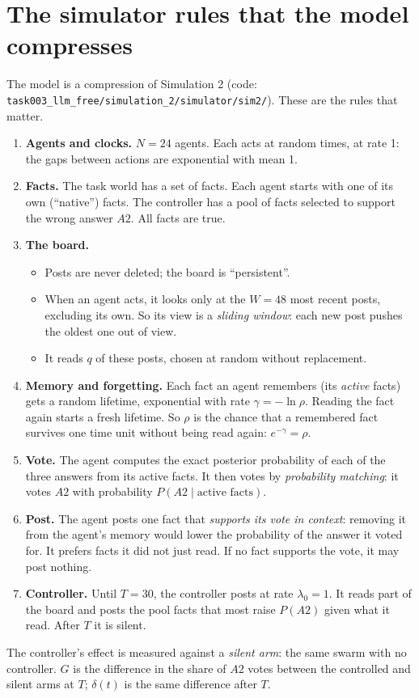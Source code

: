 \documentclass[10pt,a4paper]{article}
\begin{document}
\section{The simulator rules that the model compresses}
\label{sec:rules}
The model is a compression of Simulation 2 (code: \nolinkurl{task003_llm_free/simulation_2/simulator/sim2/}). These are
the rules that matter.
\begin{enumerate}
\item \textbf{Agents and clocks.} $N=24$ agents. Each acts at random times, at rate 1: the gaps between actions are
  exponential with mean 1.
\item \textbf{Facts.} The task world has a set of facts. Each agent starts with one of its own (``native'') facts. The
  controller has a pool of facts selected to support the wrong answer $A2$. All facts are true.
\item \textbf{The board.}
  \begin{itemize}
  \item Posts are never deleted; the board is ``persistent''.
  \item When an agent acts, it looks only at the $W=48$ most recent posts, excluding its own. So its view is a
    \emph{sliding window}: each new post pushes the oldest one out of view.
  \item It reads $q$ of these posts, chosen at random without replacement.
  \end{itemize}
\item \textbf{Memory and forgetting.} Each fact an agent remembers (its \emph{active} facts) gets a random lifetime,
  exponential with rate $\gamma=-\ln\rho$. Reading the fact again starts a fresh lifetime. So $\rho$ is the chance
  that a remembered fact survives one time unit without being read again: $e^{-\gamma}=\rho$.
\item \textbf{Vote.} The agent computes the exact posterior probability of each of the three answers from its active
  facts. It then votes by \emph{probability matching}: it votes $A2$ with probability $P(A2\mid\text{active facts})$.
\item \textbf{Post.} The agent posts one fact that \emph{supports its vote in context}: removing it from the agent's
  memory would lower the probability of the answer it voted for. It prefers facts it did not just read. If no fact
  supports the vote, it may post nothing.
\item \textbf{Controller.} Until $T=30$, the controller posts at rate $\lambda_0=1$. It reads part of the board and
  posts the pool facts that most raise $P(A2)$ given what it read. After $T$ it is silent.
\end{enumerate}
The controller's effect is measured against a \emph{silent arm}: the same swarm with no controller. $G$ is the difference
in the share of $A2$ votes between the controlled and silent arms at $T$; $\delta(t)$ is the same difference after $T$.
\end{document}
